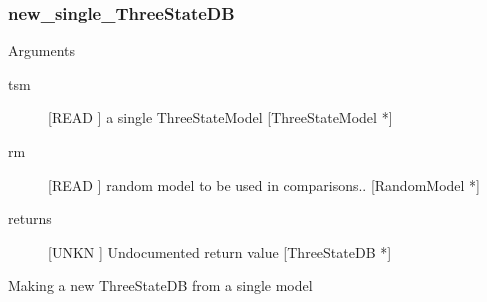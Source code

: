 \subsubsection{new_single_ThreeStateDB}

Arguments
\begin{description}
\item[tsm] [READ ] a single ThreeStateModel [ThreeStateModel *]
\item[rm] [READ ] random model to be used in comparisons.. [RandomModel *]
\item[returns] [UNKN ] Undocumented return value [ThreeStateDB *]
\end{description}
Making a new ThreeStateDB from a single
model




